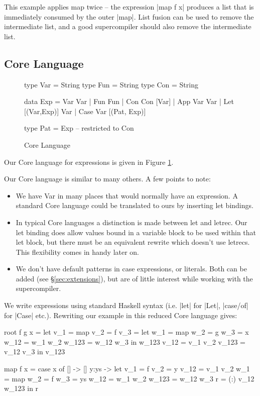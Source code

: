 \documentclass{sigplanconf}
\begin{document}
This example applies map twice -- the expression |map f x| produces a list that is immediately consumed by the outer |map|. List fusion \cite{gill:shortcut_deforestation} can be used to remove the intermediate list, and a good supercompiler should also remove the intermediate list.

\subsection{Core Language}
\label{sec:core}

\begin{figure}
\begin{code}
type Var  = String
type Fun  = String
type Con  = String

data Exp  = Var Var
          | Fun Fun
          | Con Con [Var]
          | App Var Var
          | Let [(Var,Exp)] Var
          | Case Var [(Pat, Exp)]

type Pat = Exp -- restricted to Con
\end{code}
\caption{Core Language}
\label{fig:core}
\end{figure}

Our Core language for expressions is given in Figure \ref{fig:core}.

Our Core language is similar to many others. A few points to note:

\begin{itemize}
\item We have Var in many places that would normally have an expression. A standard Core language could be translated to ours by inserting let bindings.
\item In typical Core languages a distinction is made between let and letrec. Our let binding does allow values bound in a variable block to be used within that let block, but there must be an equivalent rewrite which doesn't use letrecs. This flexibility comes in handy later on.
\item We don't have default patterns in case expressions, or literals. Both can be added (see \S\ref{sec:extensions}), but are of little interest while working with the supercompiler.
\end{itemize}

We write expressions using standard Haskell syntax (i.e. |let| for |Let|, |case/of| for |Case| etc.). Rewriting our example in this reduced Core language gives:

\begin{code}
root f g x =
    let v_1 = map
        v_2 = f
        v_3 = let w_1 = map
                  w_2 = g
                  w_3 = x
                  w_12 = w_1 w_2
                  w_123 = w_12 w_3
              in w_123
        v_12 = v_1 v_2
        v_123 = v_12 v_3
    in v_123

map f x = case x of
    [] -> []
    y:ys -> let v_1 = f
                v_2 = y
                v_12 = v_1 v_2
                w_1 = map
                w_2 = f
                w_3 = ys
                w_12 = w_1 w_2
                w_123 = w_12 w_3
                r = (:) v_12 w_123
            in r
\end{code}
\end{document}
